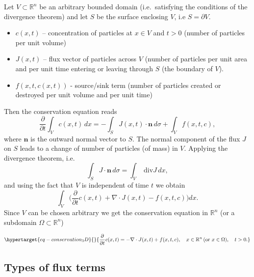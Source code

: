 \documentclass[
  letterpaper,
  DIV=11,
  numbers=noendperiod]{scrreprt}
\providecommand{\tightlist}{%
  \setlength{\itemsep}{0pt}\setlength{\parskip}{0pt}}\usepackage{longtable,booktabs,array}
\theoremstyle{plain}
\theoremstyle{definition}
\theoremstyle{plain}
\theoremstyle{remark}
\begin{document}
Let \(V \subset \mathbb R^n\) be an arbitrary bounded domain
(i.e.~satisfying the conditions of the divergence theorem) and let \(S\)
be the surface enclosing \(V\), i.e \(S = \partial V\).

\begin{itemize}
\tightlist
\item
  \(c(x,t)\) -- concentration of particles at \(x\in V\) and \(t>0\)
  (number of particles per unit volume)
\item
  \(J(x,t)\) -- flux vector of particles across \(V\) (number of
  particles per unit area and per unit time entering or leaving through
  \(S\) (the boundary of \(V\)).
\item
  \(f(x,t ,c(x,t))\) - source/sink term (number of particles created or
  destroyed per unit volume and per unit time)
\end{itemize}

Then the conservation equation reads \[
\frac{\partial}{\partial t} \int_V c(x,t) \, dx = - \int_{S} J(x,t) \cdot {\mathbf{n}} \, d\sigma + \int_V f(x,t ,c), 
\] where \(\mathbf{n}\) is the outward normal vector to \(S\). The
normal component of the flux \(J\) on \(S\) leads to a change of number
of particles (of mass) in \(V\). Applying the divergence theorem, i.e.
\[
\int_S J \cdot {\mathbf{n}} \, d\sigma = \int_V \text{ div} J \, dx,
\] and using the fact that \(V\) is independent of time \(t\) we obtain
\[
 \int_V \Big(\frac{\partial}{\partial t} c(x,t) + \nabla \cdot  J(x,t) -  f(x,t ,c)\Big) dx.
\] Since \(V\) can be chosen arbitrary we get the conservation equation
in \(\mathbb R^n\) (or a subdomain \(\Omega \subset \mathbb R^n\))

\begin{equation}\protect\hypertarget{eq-conservation_3D}{}{
\frac{\partial}{\partial t} c(x,t) =  - \nabla \cdot  J(x,t)+  f(x,t ,c), \quad x\in \mathbb R^n \,  (\text{or } x \in \Omega), \quad t >0. 
}\label{eq-conservation_3D}\end{equation}

\hypertarget{types-of-flux-terms}{%
\subsection{Types of flux terms}\label{types-of-flux-terms}}
\end{document}

